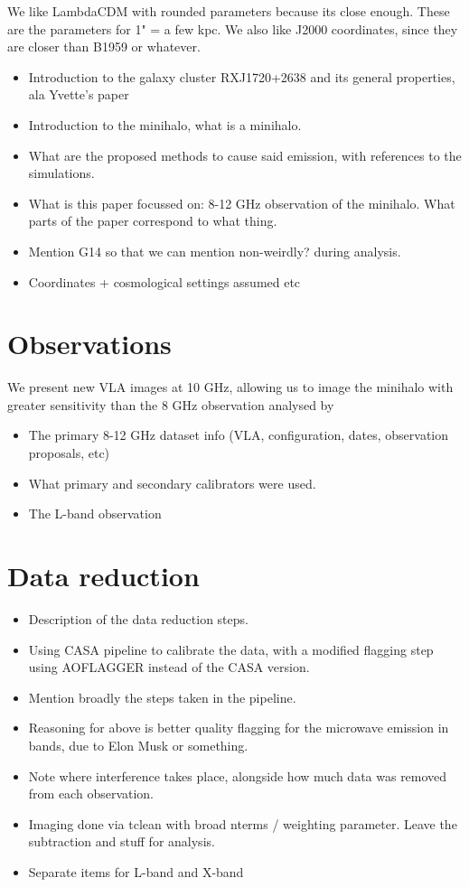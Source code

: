 \documentclass{pas}
\begin{document}
We like LambdaCDM with rounded parameters because its close enough. These are the parameters for 1" = a few kpc. We also like J2000 coordinates, since they are closer than B1959 or whatever. 

\begin{itemize}
  \item Introduction to the galaxy cluster RXJ1720+2638 and its general properties, ala Yvette's paper
  \item Introduction to the minihalo, what is a minihalo.
  \item What are the proposed methods to cause said emission, with references to the simulations.
  \item What is this paper focussed on: 8-12 GHz observation of the minihalo. What parts of the paper correspond to what thing.
  \item Mention G14 so that we can mention non-weirdly? during analysis.
  \item Coordinates + cosmological settings assumed etc
\end{itemize}

\section{Observations}
We present new VLA images at 10 GHz, allowing us to image the minihalo with greater sensitivity than the 8 GHz observation analysed by 
\begin{itemize}
  \item The primary 8-12 GHz dataset info (VLA, configuration, dates, observation proposals, etc)
  \item What primary and secondary calibrators were used.
  \item The L-band observation
\end{itemize}

\section{Data reduction}

\begin{itemize}
  \item Description of the data reduction steps.
  \item Using CASA pipeline to calibrate the data, with a modified flagging step using AOFLAGGER instead of the CASA version.
  \item Mention broadly the steps taken in the pipeline.
  \item Reasoning for above is better quality flagging for the microwave emission in bands, due to Elon Musk or something.
  \item Note where interference takes place, alongside how much data was removed from each observation. 
  \item Imaging done via tclean with broad nterms / weighting parameter. Leave the subtraction and stuff for analysis. 
  \item Separate items for L-band and X-band
\end{itemize}
\end{document}

